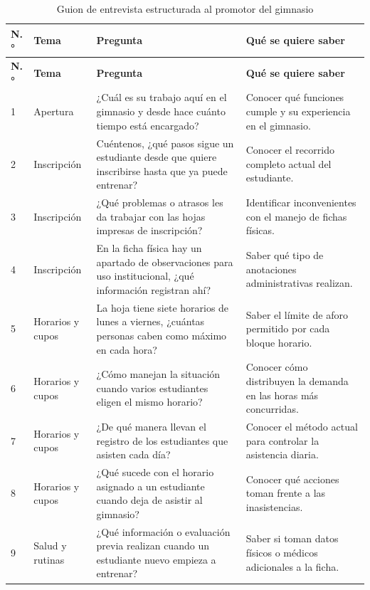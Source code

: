 \documentclass[12pt,a4paper]{article}
\begin{document}
\begingroup\small
\begin{longtable}{>{\raggedright\arraybackslash}p{0.8cm} >{\raggedright\arraybackslash}p{2.9cm} >{\raggedright\arraybackslash}p{6.2cm} >{\raggedright\arraybackslash}p{4.0cm}}
\caption{Guion de entrevista estructurada al promotor del gimnasio}\\
\rowcolor{azulP}\textbf{N.°} & \textbf{Tema} & \textbf{Pregunta} & \textbf{Qué se quiere saber} \\
\endfirsthead
\rowcolor{azulP}\textbf{N.°} & \textbf{Tema} & \textbf{Pregunta} & \textbf{Qué se quiere saber} \\
\endhead
\rowcolor{azulS}1 & Apertura & ¿Cuál es su trabajo aquí en el gimnasio y desde hace cuánto tiempo está encargado? & Conocer qué funciones cumple y su experiencia en el gimnasio. \\
\rowcolor{white}2 & {    } Inscripción & Cuéntenos, ¿qué pasos sigue un estudiante desde que quiere inscribirse hasta que ya puede entrenar? & Conocer el recorrido completo actual del estudiante. \\
\rowcolor{azulS}3 & {    }  Inscripción & ¿Qué problemas o atrasos les da trabajar con las hojas impresas de inscripción? & Identificar inconvenientes con el manejo de fichas físicas. \\
\rowcolor{white}4 & {     } Inscripción & En la ficha física hay un apartado de observaciones para uso institucional, ¿qué información registran ahí? & Saber qué tipo de anotaciones administrativas realizan. \\
\rowcolor{azulS}5 & {    } Horarios y cupos & La hoja tiene siete horarios de lunes a viernes, ¿cuántas personas caben como máximo en cada hora? & Saber el límite de aforo permitido por cada bloque horario. \\
\rowcolor{white}6 & {     } Horarios y cupos & ¿Cómo manejan la situación cuando varios estudiantes eligen el mismo horario? & Conocer cómo distribuyen la demanda en las horas más concurridas. \\
\rowcolor{azulS}7 & {      } Horarios y cupos & ¿De qué manera llevan el registro de los estudiantes que asisten cada día? & Conocer el método actual para controlar la asistencia diaria. \\
\rowcolor{white}8 & {     } Horarios y cupos & ¿Qué sucede con el horario asignado a un estudiante cuando deja de asistir al gimnasio? & Conocer qué acciones toman frente a las inasistencias. \\
\rowcolor{azulS}9 & {     } Salud y rutinas & ¿Qué información o evaluación previa realizan cuando un estudiante nuevo empieza a entrenar? & Saber si toman datos físicos o médicos adicionales a la ficha. \\

\end{longtable}
\end{document}
